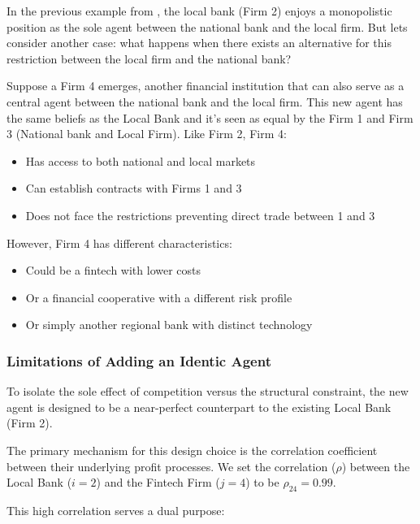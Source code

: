 In the previous example from , the local bank (Firm 2) enjoys a monopolistic position as the sole agent between the national bank and the local firm. But lets consider another case: what happens when there exists an alternative for this restriction between the local firm and the national bank?

Suppose a Firm 4 emerges, another financial institution that can also serve as a central agent between the national bank and the local firm. This new agent has the same beliefs as the Local Bank and it's seen as equal by the Firm 1 and Firm 3 (National bank and Local Firm). Like Firm 2, Firm 4:
\begin{itemize}
    \item Has access to both national and local markets
    \item Can establish contracts with Firms 1 and 3
    \item Does not face the restrictions preventing direct trade between 1 and 3
\end{itemize}

However, Firm 4 has different characteristics:
\begin{itemize}
    \item Could be a fintech with lower costs
    \item Or a financial cooperative with a different risk profile
    \item Or simply another regional bank with distinct technology
\end{itemize}

\subsubsection{Limitations of Adding an Identic Agent} \label{limitations}

To isolate the sole effect of competition versus the structural constraint, the new agent is designed to be a near-perfect counterpart to the existing Local Bank (Firm 2).

The primary mechanism for this design choice is the correlation coefficient between their underlying profit processes. We set the correlation ($\rho$) between the Local Bank ($i=2$) and the Fintech Firm ($j=4$) to be $\rho_{24} = 0.99$.

This high correlation serves a dual purpose:

